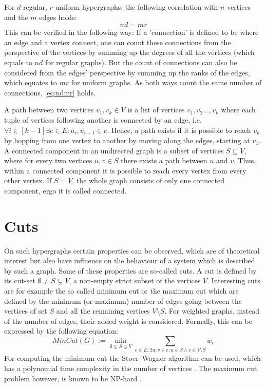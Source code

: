 For $d$-regular, $r$-uniform hypergraphs, the following correlation with $n$ vertices and the $m$ edges holds:
\begin{equation}\label{eq:ndmr}
	 n d = m r
\end{equation}
 This can be verified in the following way: If a 'connection' is defined to be where an edge and a vertex connect, one can count these connections from the perspective of the vertices by summing up the degrees of all the vertices (which equals to $nd$ for regular graphs). But the count of connections can also be considered from the edges' perspective by summing up the ranks of the edges, which equates to $mr$ for uniform graphs. As both ways count the same number of connections, \cref{eq:ndmr} holds.
 
 
A path between two vertices $v_1,v_k\in V$ is a list of vertices $v_1, v_2 \ldots , v_k$ where each tuple of vertices following another is connected by an edge, i.e. $\forall i \in [k-1]\exists e \in E: u_i, u_{i+1} \in e  $. Hence, a path exists if it is possible to reach $v_k$ by hopping from one vertex to another by moving along the edges, starting at $v_1$.
A connected component in an undirected graph is a subset of vertices $S\subseteq V$,  where for every two vertices $u,v \in S$ there exists a path between $u$ and $v$. Thus, within a connected component it is possible to reach every vertex from every other vertex. If $S=V$, the whole graph consists of only one connected component, ergo it is called connected.

\section{Cuts}
On such hypergraphs certain properties can be observed, which are of theoretical interest but also have influence on the behaviour of a system which is described by such a graph. Some of these properties are so-called cuts. A cut is defined by its cut-set $\emptyset \neq S \subsetneq V$, a non-empty strict subset of the vertices $V$. Interesting cuts are for example the so called minimum cut or the maximum cut which are defined by the minimum (or maximum) number of edges going between the vertices of set $S$ and all the remaining vertices $V \setminus S$. For weighted graphs, instead of the number of edges, their added weight is considered. Formally, this can be expressed by the following equation: \begin{equation}
MinCut(G) := \min_{\emptyset \subsetneq S \subsetneq V} \sum_{e\in E:\exists u, v \in e: u \in S \land v \in V \setminus S } w_e
\end{equation}
For computing the minimum cut the Stoer–Wagner algorithm can be used, which has a polynomial time complexity in the number of vertices \cite{stoer1997simple}.
The maximum cut problem however, is known to be NP-hard \cite{karp1972reducibility}.

